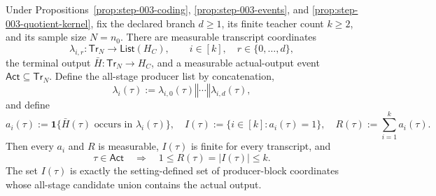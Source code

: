 \begin{lemma}\label{lem:step-004-occurrence}
Under  Propositions~\ref{prop:step-003-coding},
\ref{prop:step-003-events}, and
\ref{prop:step-003-quotient-kernel}, fix the declared branch \(d\geq1\),
its finite teacher count \(k\geq2\), and its sample size \(N=n_0\). There
are measurable transcript coordinates
\[
\lambda_{i,r}:\mathsf{Tr}_N\longrightarrow
\mathsf{List}(H_C),
\qquad i\in[k],\quad r\in\{0,\ldots,d\},
\tag{2}
\]
the terminal output \(\bar H:\mathsf{Tr}_N\to H_C\), and a measurable
actual-output event \(\mathsf{Act}\subseteq\mathsf{Tr}_N\). Define the
all-stage producer list by concatenation,
\[
\lambda_i(\tau)
:=\lambda_{i,0}(\tau)\mathbin{\Vert}\cdots
  \mathbin{\Vert}\lambda_{i,d}(\tau),
\tag{3}
\]
and define
\[
a_i(\tau):=
\mathbf1\{\bar H(\tau)\text{ occurs in }\lambda_i(\tau)\},
\quad
I(\tau):=\{i\in[k]:a_i(\tau)=1\},
\quad
R(\tau):=\sum_{i=1}^k a_i(\tau).
\tag{4}
\]
Then every \(a_i\) and \(R\) is measurable, \(I(\tau)\) is finite for
every transcript, and
\[
\tau\in\mathsf{Act}\quad\Longrightarrow\quad
1\leq R(\tau)=|I(\tau)|\leq k.
\tag{5}
\]
The set \(I(\tau)\) is exactly the setting-defined set of producer-block
coordinates whose all-stage candidate union contains the actual output.


\end{lemma}

